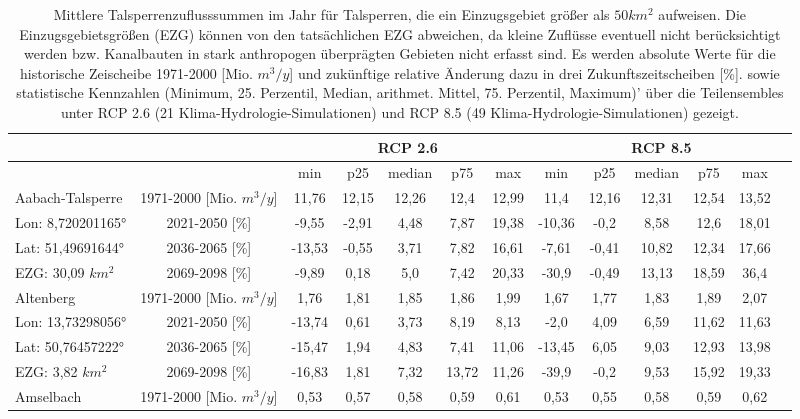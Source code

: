 \renewcommand{\arraystretch}{1.2}
\addtolength{\tabcolsep}{-5.9pt}
\scriptsize
\begin{longtable}{@{\extracolsep{\fill}}lc|ccccc||cccccc}
\caption{Mittlere Talsperrenzuflusssummen im Jahr für Talsperren, die ein Einzugsgebiet größer als $50 km^2$ aufweisen. Die Einzugsgebietsgrößen (EZG) können von den tatsächlichen EZG abweichen, da kleine Zuflüsse eventuell nicht berücksichtigt werden bzw. Kanalbauten in stark anthropogen überprägten Gebieten nicht erfasst sind. Es werden absolute Werte für die historische Zeischeibe 1971-2000 [Mio. $m^3/y$] und zukünftige relative Änderung dazu in drei Zukunftszeitscheiben [\%]. sowie statistische Kennzahlen (Minimum, 25. Perzentil, Median, arithmet. Mittel, 75. Perzentil, Maximum)' über die Teilensembles unter RCP 2.6 (21 Klima-Hydrologie-Simulationen) und RCP 8.5 (49 Klima-Hydrologie-Simulationen) gezeigt.}\\  \hline
\multicolumn{2}{c}{} & \multicolumn{5}{c||}{RCP 2.6}  & \multicolumn{6}{c}{RCP 8.5}\\ \hline
\multicolumn{2}{c|}{} & min & p25 & median & p75 & max & min & p25 & median & p75 & max\\ 
\hline 
Aabach-Talsperre & 1971-2000 [Mio. $m^3/y$]  & 11,76 & 12,15 & 12,26 & 12,4 & 12,99 & 11,4 & 12,16 & 12,31 & 12,54 & 13,52 & \\ 
\cline{2-13} 
Lon: 8,720201165° & 2021-2050 [\%]  & -9,55 & -2,91 & 4,48 & 7,87 & 19,38 & -10,36 & -0,2 & 8,58 & 12,6 & 18,01 & \\ 
Lat: 51,49691644° & 2036-2065 [\%]  & -13,53 & -0,55 & 3,71 & 7,82 & 16,61 & -7,61 & -0,41 & 10,82 & 12,34 & 17,66 & \\ 
EZG: 30,09 $km^2$ & 2069-2098 [\%]  & -9,89 & 0,18 & 5,0 & 7,42 & 20,33 & -30,9 & -0,49 & 13,13 & 18,59 & 36,4 & \\ 
\hline 
Altenberg & 1971-2000 [Mio. $m^3/y$]  & 1,76 & 1,81 & 1,85 & 1,86 & 1,99 & 1,67 & 1,77 & 1,83 & 1,89 & 2,07 & \\ 
\cline{2-13} 
Lon: 13,73298056° & 2021-2050 [\%]  & -13,74 & 0,61 & 3,73 & 8,19 & 8,13 & -2,0 & 4,09 & 6,59 & 11,62 & 11,63 & \\ 
Lat: 50,76457222° & 2036-2065 [\%]  & -15,47 & 1,94 & 4,83 & 7,41 & 11,06 & -13,45 & 6,05 & 9,03 & 12,93 & 13,98 & \\ 
EZG: 3,82 $km^2$ & 2069-2098 [\%]  & -16,83 & 1,81 & 7,32 & 13,72 & 11,26 & -39,9 & -0,2 & 9,53 & 15,92 & 19,33 & \\ 
\hline 
Amselbach & 1971-2000 [Mio. $m^3/y$]  & 0,53 & 0,57 & 0,58 & 0,59 & 0,61 & 0,53 & 0,55 & 0,58 & 0,59 & 0,62 & \\ 

\end{longtable}
